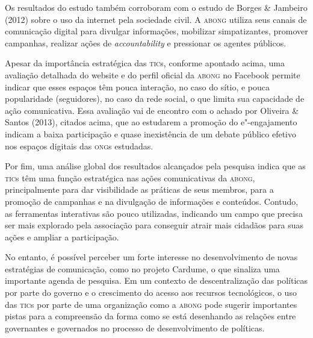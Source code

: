 Os resultados do estudo também corroboram com o estudo de Borges \&
Jambeiro (2012) sobre o uso da internet pela sociedade civil. A \textsc{abong}
utiliza seus canais de comunicação digital para divulgar informações,
mobilizar simpatizantes, promover campanhas, realizar ações de
\emph{accountability} e pressionar os agentes públicos.

Apesar da importância estratégica das \textsc{tic}s, conforme apontado acima, uma
avaliação detalhada do website e do perfil oficial da \textsc{abong} no Facebook
permite indicar que esses espaços têm pouca interação, no caso do sítio,
e pouca popularidade (seguidores), no caso da rede social, o que limita
sua capacidade de ação comunicativa. Essa avaliação vai de encontro com
o achado por Oliveira \& Santos (2013), citados acima, que ao estudarem
a promoção do e"-engajamento indicam a baixa participação e quase
inexistência de um debate público efetivo nos espaços digitais das \textsc{ong}s
estudadas.

Por fim, uma análise global dos resultados alcançados pela pesquisa
indica que as \textsc{tic}s têm uma função estratégica nas ações comunicativas da
\textsc{abong}, principalmente para dar visibilidade as práticas de seus membros,
para a promoção de campanhas e na divulgação de informações e conteúdos.
Contudo, as ferramentas interativas são pouco utilizadas, indicando um
campo que precisa ser mais explorado pela associação para conseguir
atrair mais cidadãos para suas ações e ampliar a participação.

No entanto, é possível perceber um forte interesse no desenvolvimento de
novas estratégias de comunicação, como no projeto Cardume, o que
sinaliza uma importante agenda de pesquisa. Em um contexto de
descentralização das políticas por parte do governo e o crescimento do
acesso aos recursos tecnológicos, o uso das \textsc{tic}s por parte de uma
organização como a \textsc{abong} pode sugerir importantes pistas para a
compreensão da forma como se está desenhando as relações entre
governantes e governados no processo de desenvolvimento de políticas.


